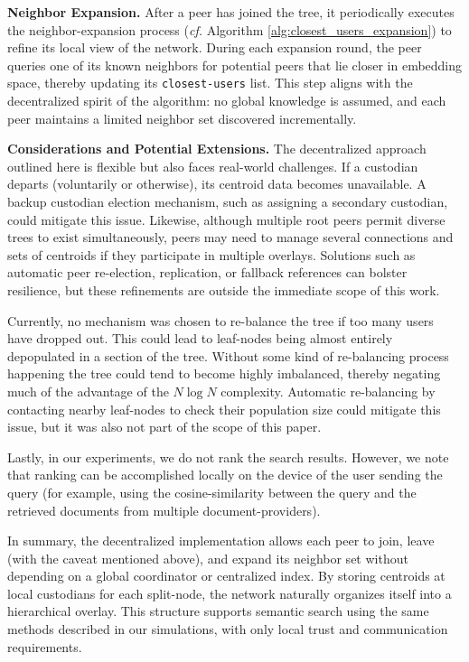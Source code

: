 \documentclass[10pt,journal]{IEEEtran}
\begin{document}
\textbf{Neighbor Expansion.}
After a peer has joined the tree, it periodically executes the neighbor-expansion process (\emph{cf.} Algorithm \ref{alg:closest_users_expansion}) to refine its local view of the network. During each expansion round, the peer queries one of its known neighbors for potential peers that lie closer in embedding space, thereby updating its \texttt{closest-users} list. This step aligns with the decentralized spirit of the algorithm: no global knowledge is assumed, and each peer maintains a limited neighbor set discovered incrementally. 

\textbf{Considerations and Potential Extensions.}
The decentralized approach outlined here is flexible but also faces real-world challenges. If a custodian departs (voluntarily or otherwise), its centroid data becomes unavailable. A backup custodian election mechanism, such as assigning a secondary custodian, could mitigate this issue. Likewise, although multiple root peers permit diverse trees to exist simultaneously, peers may need to manage several connections and sets of centroids if they participate in multiple overlays. Solutions such as automatic peer re-election, replication, or fallback references can bolster resilience, but these refinements are outside the immediate scope of this work. 

Currently, no mechanism was chosen to re-balance the tree if too many users have dropped out. This could lead to leaf-nodes being almost entirely depopulated in a section of the tree. Without some kind of re-balancing process happening the tree could tend to become highly imbalanced, thereby negating much of the advantage of the $N \log N$ complexity. Automatic re-balancing by contacting nearby leaf-nodes to check their population size could mitigate this issue, but it was also not part of the scope of this paper.

Lastly, in our experiments, we do not rank the search results. However, we note that ranking can be accomplished locally on the device of the user sending the query (for example, using the cosine-similarity between the query and the retrieved documents from multiple document-providers).

In summary, the decentralized implementation allows each peer to join, leave (with the caveat mentioned above), and expand its neighbor set without depending on a global coordinator or centralized index. By storing centroids at local custodians for each split-node, the network naturally organizes itself into a hierarchical overlay. This structure supports semantic search using the same methods described in our simulations, with only local trust and communication requirements.
\end{document}
